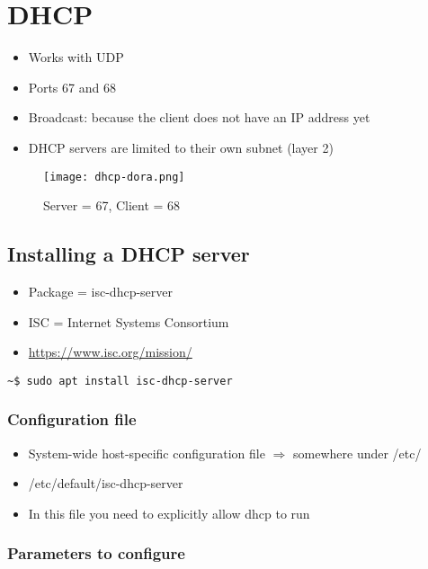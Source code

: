 \documentclass{article}
\begin{document}
\section{DHCP}

\begin{itemize}
    \item Works with UDP
    \item Ports 67 and 68
    \item Broadcast: because the client does not have an IP address yet
    \item DHCP servers are limited to their own subnet (layer 2)
\end{itemize}

\begin{figure}[H]
    \centering
    \texttt{[image: dhcp-dora.png]}
    \caption{Server = 67, Client = 68}
\end{figure}

\subsection{Installing a DHCP server}

\begin{itemize}
    \item Package = isc-dhcp-server
    \item ISC = Internet Systems Consortium 
    \item \url{https://www.isc.org/mission/}
\end{itemize}

\begin{verbatim}
~$ sudo apt install isc-dhcp-server
\end{verbatim}

\subsubsection{Configuration file}

\begin{itemize}
    \item System-wide host-specific configuration file $\Rightarrow$ somewhere under /etc/
    \item /etc/default/isc-dhcp-server
    \item In this file you need to explicitly allow dhcp to run
\end{itemize}

\subsubsection{Parameters to configure}
\end{document}
